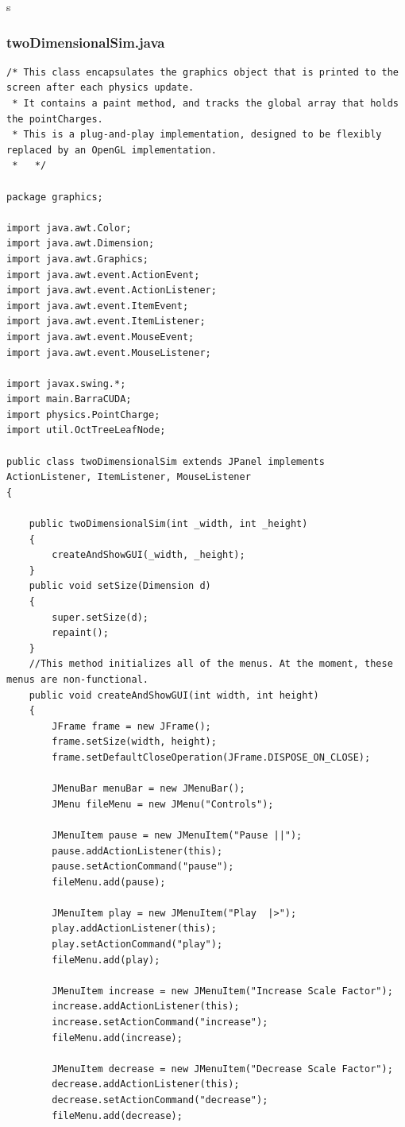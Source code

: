 s\documentclass[10pt]{article}
\begin{document}
\subsubsection{twoDimensionalSim.java}
\tiny
\begin{verbatim}
/* This class encapsulates the graphics object that is printed to the screen after each physics update.
 * It contains a paint method, and tracks the global array that holds the pointCharges.
 * This is a plug-and-play implementation, designed to be flexibly replaced by an OpenGL implementation.
 *   */

package graphics;

import java.awt.Color;
import java.awt.Dimension;
import java.awt.Graphics;
import java.awt.event.ActionEvent;
import java.awt.event.ActionListener;
import java.awt.event.ItemEvent;
import java.awt.event.ItemListener;
import java.awt.event.MouseEvent;
import java.awt.event.MouseListener;

import javax.swing.*;
import main.BarraCUDA;
import physics.PointCharge;
import util.OctTreeLeafNode;

public class twoDimensionalSim extends JPanel implements ActionListener, ItemListener, MouseListener
{
	
	public twoDimensionalSim(int _width, int _height)
	{
		createAndShowGUI(_width, _height);	
	}
	public void setSize(Dimension d)
	{
		super.setSize(d);
		repaint();
	}
	//This method initializes all of the menus. At the moment, these menus are non-functional.
	public void createAndShowGUI(int width, int height)
	{
		JFrame frame = new JFrame();
		frame.setSize(width, height);
		frame.setDefaultCloseOperation(JFrame.DISPOSE_ON_CLOSE);

		JMenuBar menuBar = new JMenuBar();
		JMenu fileMenu = new JMenu("Controls");

		JMenuItem pause = new JMenuItem("Pause ||");
		pause.addActionListener(this);
		pause.setActionCommand("pause");
		fileMenu.add(pause);

		JMenuItem play = new JMenuItem("Play  |>");
		play.addActionListener(this);
		play.setActionCommand("play");
		fileMenu.add(play);

		JMenuItem increase = new JMenuItem("Increase Scale Factor");
		increase.addActionListener(this);
		increase.setActionCommand("increase");
		fileMenu.add(increase);
		
		JMenuItem decrease = new JMenuItem("Decrease Scale Factor");
		decrease.addActionListener(this);
		decrease.setActionCommand("decrease");
		fileMenu.add(decrease);
		

\end{verbatim}
\end{document}
